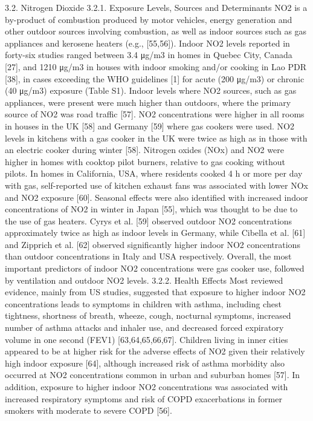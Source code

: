  3.2. Nitrogen Dioxide
3.2.1. Exposure Levels, Sources and Determinants
NO2 is a by-product of combustion produced by motor vehicles, energy generation and other outdoor sources involving combustion, as well as indoor sources such as gas appliances and kerosene heaters (e.g., [55,56]).
Indoor NO2 levels reported in forty-six studies ranged between 3.4 μg/m3 in homes in Quebec City, Canada [27], and 1210 μg/m3 in houses with indoor smoking and/or cooking in Lao PDR [38], in cases exceeding the WHO guidelines [1] for acute (200 μg/m3) or chronic (40 μg/m3) exposure (Table S1). Indoor levels where NO2 sources, such as gas appliances, were present were much higher than outdoors, where the primary source of NO2 was road traffic [57]. NO2 concentrations were higher in all rooms in houses in the UK [58] and Germany [59] where gas cookers were used. NO2 levels in kitchens with a gas cooker in the UK were twice as high as in those with an electric cooker during winter [58]. Nitrogen oxides (NOx) and NO2 were higher in homes with cooktop pilot burners, relative to gas cooking without pilots. In homes in California, USA, where residents cooked 4 h or more per day with gas, self-reported use of kitchen exhaust fans was associated with lower NOx and NO2 exposure [60].
Seasonal effects were also identified with increased indoor concentrations of NO2 in winter in Japan [55], which was thought to be due to the use of gas heaters. Cyrys et al. [59] observed outdoor NO2 concentrations approximately twice as high as indoor levels in Germany, while Cibella et al. [61] and Zipprich et al. [62] observed significantly higher indoor NO2 concentrations than outdoor concentrations in Italy and USA respectively. Overall, the most important predictors of indoor NO2 concentrations were gas cooker use, followed by ventilation and outdoor NO2 levels.
3.2.2. Health Effects
Most reviewed evidence, mainly from US studies, suggested that exposure to higher indoor NO2 concentrations leads to symptoms in children with asthma, including chest tightness, shortness of breath, wheeze, cough, nocturnal symptoms, increased number of asthma attacks and inhaler use, and decreased forced expiratory volume in one second (FEV1) [63,64,65,66,67]. Children living in inner cities appeared to be at higher risk for the adverse effects of NO2 given their relatively high indoor exposure [64], although increased risk of asthma morbidity also occurred at NO2 concentrations common in urban and suburban homes [57]. In addition, exposure to higher indoor NO2 concentrations was associated with increased respiratory symptoms and risk of COPD exacerbations in former smokers with moderate to severe COPD [56].

